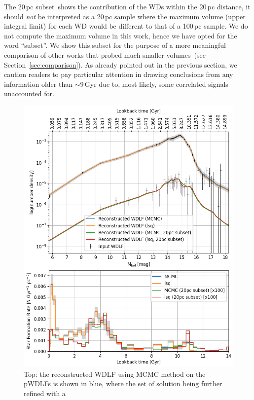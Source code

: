 \documentclass[fleqn,usenatbib]{mnras}
\begin{document}
The 20\,pc subset\ shows the contribution of the WDs within the 20\,pc distance,
it should \textit{not} be interpreted as a 20\,pc sample where the maximum
volume (upper integral limit) for each WD would be different to that of a
100\,pc sample. We do not compute the maximum volume in this work, hence we have
opted for the word ``subset''. We show this subset for the purpose of a more
meaningful comparison of other works that probed much smaller volumes~(see 
Section~\ref{sec:comparison}). As already pointed out in the previous section,
we caution readers to pay particular attention in drawing conclusions from any 
information older than $\sim$$9$\,Gyr due to, most likely, some correlated
signals unaccounted for.

\begin{figure}
    \includegraphics[width=
    \columnwidth]{figures/fig_05_gcns_reconstructed_wdlf_optimal_resolution_bin_optimal.png}
    \caption{Top: the reconstructed WDLF using MCMC method on the pWDLFs is
    shown in blue, where the set of solution being further refined with a
}
\end{figure}
\end{document}

